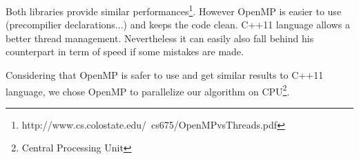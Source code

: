 Both libraries provide similar performances\footnote{http://www.cs.colostate.edu/~cs675/OpenMPvsThreads.pdf}. However OpenMP is easier to use (precompilier declarations...) and keeps the code clean. C++11 language allows a better thread management. Nevertheless it can easily also fall behind his counterpart in term of speed if some mistakes are made.

Considering that OpenMP is safer to use and get similar results to C++11 language, we chose OpenMP to parallelize our algorithm on CPU\footnote{Central Processing Unit}.